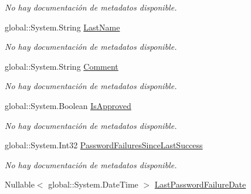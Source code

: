 \begin{DoxyCompactItemize}
\begin{DoxyCompactList}\small\item\em No hay documentación de metadatos disponible. \end{DoxyCompactList}\item 
global\-::\-System.\-String \hyperlink{class_microsoft_1_1_samples_1_1_kinect_1_1_basic_interactions_1_1_users_a6e000a40f5a0ad78dc5014c4bbe557bb}{Last\-Name}
\begin{DoxyCompactList}\small\item\em No hay documentación de metadatos disponible. \end{DoxyCompactList}\item 
global\-::\-System.\-String \hyperlink{class_microsoft_1_1_samples_1_1_kinect_1_1_basic_interactions_1_1_users_a4c32a9ed4a43f1515e7e7405fb0ead91}{Comment}
\begin{DoxyCompactList}\small\item\em No hay documentación de metadatos disponible. \end{DoxyCompactList}\item 
global\-::\-System.\-Boolean \hyperlink{class_microsoft_1_1_samples_1_1_kinect_1_1_basic_interactions_1_1_users_a25c87f9eb56f7d1058cc28954c448140}{Is\-Approved}
\begin{DoxyCompactList}\small\item\em No hay documentación de metadatos disponible. \end{DoxyCompactList}\item 
global\-::\-System.\-Int32 \hyperlink{class_microsoft_1_1_samples_1_1_kinect_1_1_basic_interactions_1_1_users_af506f7d18fadcd3f92bf157781d60b8e}{Password\-Failures\-Since\-Last\-Success}
\begin{DoxyCompactList}\small\item\em No hay documentación de metadatos disponible. \end{DoxyCompactList}\item 
Nullable$<$ global\-::\-System.\-Date\-Time $>$ \hyperlink{class_microsoft_1_1_samples_1_1_kinect_1_1_basic_interactions_1_1_users_a451a1719bed9173843c683911f5e1f87}{Last\-Password\-Failure\-Date}

\end{DoxyCompactItemize}
